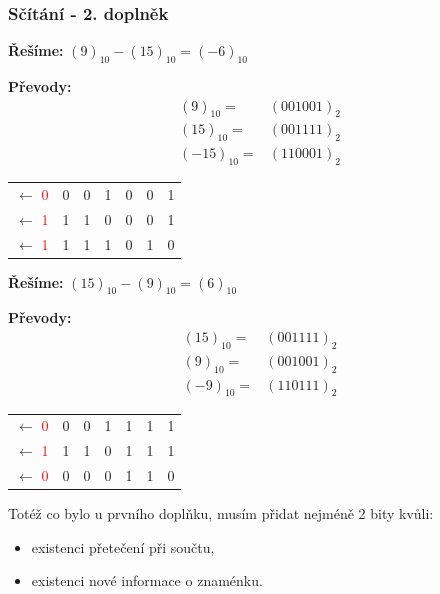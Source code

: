 	\begin{frame}
    \frametitle{Sčítání - 2. doplněk}
    \small
    \boldmath
		\begin{minipage}[t][0.65\textheight][t]{0.49\textwidth}
      \textbf{Řešíme:} $(9)_{10} - (15)_{10} = (-6)_{10}$
      
      \textbf{Převody:} 
      \begin{align*}
      (9)_{10} =& (001001)_2 \\
      (15)_{10} =& (001111)_2 \\
      (-15)_{10} =& (110001)_2
      \end{align*}
      \vspace{5mm}
      \centering
			\begin{tabular}{ c | c c c c c c}
				   $\longleftarrow$ \textcolor{red}{0} & 0 & 0 & 1 & 0 & 0 & 1 \\
				   $\longleftarrow$ \textcolor{red}{1} & 1 & 1 & 0 & 0 & 0 & 1 \\
        \hline
           $\longleftarrow$ \textcolor{red}{1} & 1 & 1 & 1 & 0 & 1 & 0 \\
			\end{tabular}
      
		\end{minipage}
		\begin{minipage}[t][0.65\textheight][t]{0.5\textwidth}
      \textbf{Řešíme:} $(15)_{10} - (9)_{10} = (6)_{10}$ 
      
      \textbf{Převody:} 
      \begin{align*}
      (15)_{10} =& (001111)_2 \\
      (9)_{10} =& (001001)_2 \\
      (-9)_{10} =& (110111)_2
      \end{align*}
      \vspace{5mm}
      \centering
			\begin{tabular}{ c | c c c c c c}
				   $\longleftarrow$ \textcolor{red}{0} & 0 & 0 & 1 & 1 & 1 & 1 \\
				   $\longleftarrow$ \textcolor{red}{1} & 1 & 1 & 0 & 1 & 1 & 1 \\
        \hline
           $\longleftarrow$ \textcolor{red}{0} & 0 & 0 & 0 & 1 & 1 & 0 \\
			\end{tabular}
      
		\end{minipage}
    
    Totéž co bylo u prvního doplňku, musím přidat nejméně 2 bity kvůli:
     \begin{itemize}
      \item existenci přetečení při součtu,
      \item existenci nové informace o znaménku.
    \end{itemize}
	\end{frame}
